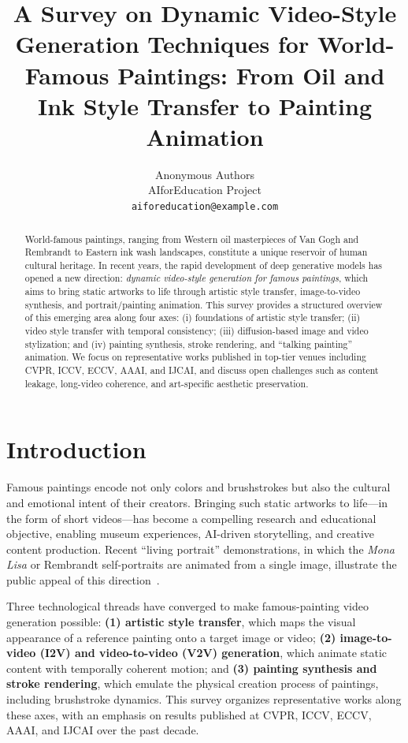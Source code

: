 \documentclass[letterpaper,twocolumn,10pt]{article}
\title{A Survey on Dynamic Video-Style Generation Techniques for World-Famous Paintings:
From Oil and Ink Style Transfer to Painting Animation}
\author{
  Anonymous Authors\\
  AIforEducation Project\\
  \texttt{aiforeducation@example.com}
}
\begin{document}
\maketitle

\begin{abstract}
World-famous paintings, ranging from Western oil masterpieces of Van Gogh and Rembrandt
to Eastern ink wash landscapes, constitute a unique reservoir of human cultural heritage.
In recent years, the rapid development of deep generative models has opened a new direction:
\emph{dynamic video-style generation for famous paintings}, which aims to bring static
artworks to life through artistic style transfer, image-to-video synthesis, and
portrait/painting animation. This survey provides a structured overview of this emerging
area along four axes: (i) foundations of artistic style transfer; (ii) video style
transfer with temporal consistency; (iii) diffusion-based image and video stylization;
and (iv) painting synthesis, stroke rendering, and ``talking painting'' animation.
We focus on representative works published in top-tier venues including CVPR, ICCV,
ECCV, AAAI, and IJCAI, and discuss open challenges such as content leakage, long-video
coherence, and art-specific aesthetic preservation.
\end{abstract}

\section{Introduction}
\label{sec:intro}

Famous paintings encode not only colors and brushstrokes but also the cultural and
emotional intent of their creators. Bringing such static artworks to life---in the form
of short videos---has become a compelling research and educational objective, enabling
museum experiences, AI-driven storytelling, and creative content production. Recent
``living portrait'' demonstrations, in which the \textit{Mona Lisa} or Rembrandt
self-portraits are animated from a single image, illustrate the public appeal of this
direction~\cite{zakharov2019fewshot,guo2024liveportrait}.

Three technological threads have converged to make famous-painting video generation
possible: \textbf{(1) artistic style transfer}, which maps the visual appearance of a
reference painting onto a target image or video; \textbf{(2) image-to-video (I2V) and
video-to-video (V2V) generation}, which animate static content with temporally coherent
motion; and \textbf{(3) painting synthesis and stroke rendering}, which emulate the
physical creation process of paintings, including brushstroke dynamics. This survey
organizes representative works along these axes, with an emphasis on results published at
CVPR, ICCV, ECCV, AAAI, and IJCAI over the past decade.
\end{document}
